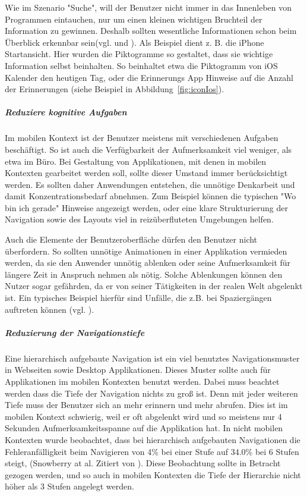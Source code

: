 Wie im Szenario "Suche", will der Benutzer nicht immer in das Innenleben von Programmen eintauchen, nur um einen kleinen wichtigen Bruchteil der Information zu gewinnen. Deshalb sollten wesentliche Informationen schon beim Überblick erkennbar sein(vgl. \cite[Seite 54]{mobileFrontier} und \cite{Neil:2012uf}). Als Beispiel dient z. B. die iPhone Startansicht. Hier wurden die Piktogramme so gestaltet, dass sie wichtige Information selbst beinhalten. So beinhaltet etwa die Piktogramm von iOS Kalender den heutigen Tag, oder die Erinnerungs App Hinweise auf die Anzahl der Erinnerungen (siehe Beispiel in Abbildung~\ref{fig:iconIos}).


\subparagraph{Reduziere kognitive Aufgaben} 
\label{subp:reduziere_kognitive_aufgaben_}

Im mobilen Kontext ist der Benutzer meistens mit verschiedenen Aufgaben beschäftigt. So ist auch die Verfügbarkeit der Aufmerksamkeit viel weniger, als etwa im Büro. Bei Gestaltung von Applikationen, mit denen in mobilen Kontexten gearbeitet werden soll, sollte dieser Umstand immer berücksichtigt werden. Es sollten daher Anwendungen entstehen, die unnötige Denkarbeit und damit Konzentrationsbedarf abnehmen. Zum Beispiel können die typischen "Wo bin ich gerade" Hinweise angezeigt werden, oder eine klare Strukturierung der Navigation sowie des Layouts viel in reizüberfluteten Umgebungen helfen. 

Auch die Elemente der Benutzeroberfläche dürfen den Benutzer nicht überfordern. So sollten unnötige Animationen in einer Applikation vermieden werden, da sie den Anwender unnötig ablenken oder seine Aufmerksamkeit für längere Zeit in Anspruch nehmen als nötig. Solche Ablenkungen können den Nutzer sogar gefährden, da er von seiner Tätigkeiten in der realen Welt abgelenkt ist. Ein typisches Beispiel hierfür sind Unfälle, die z.B. bei Spaziergängen auftreten können (vgl. \cite{Nasar:2008cc}).

\subparagraph{Reduzierung der Navigationstiefe} 
\label{subp:reduziere_das_w_hlen}

Eine hierarchisch aufgebaute Navigation ist ein viel benutztes Navigationsmuster in Webseiten sowie Desktop Applikationen. Dieses Muster sollte auch für Applikationen im mobilen Kontexten benutzt werden. Dabei muss beachtet werden dass die Tiefe der Navigation nichts zu groß ist. Denn mit jeder weiteren Tiefe muss der Benutzer sich an mehr erinnern und mehr abrufen. Dies ist im mobilen Kontext schwierig, weil er oft abgelenkt wird und so meistens nur 4 Sekunden Aufmerksamkeitsspanne auf die Applikation hat\cite{Oulasvirta:2005vn}. In nicht mobilen Kontexten wurde beobachtet, dass bei hierarchisch aufgebauten Navigationen die Fehleranfälligkeit beim Navigieren von 4\% bei einer Stufe auf 34.0\% bei 6 Stufen steigt, (Snowberry at al. Zitiert von \cite{Chae:2004gp}). Diese Beobachtung sollte in Betracht gezogen werden, und so auch in mobilen Kontexten die Tiefe der Hierarchie nicht höher als 3 Stufen angelegt werden.

